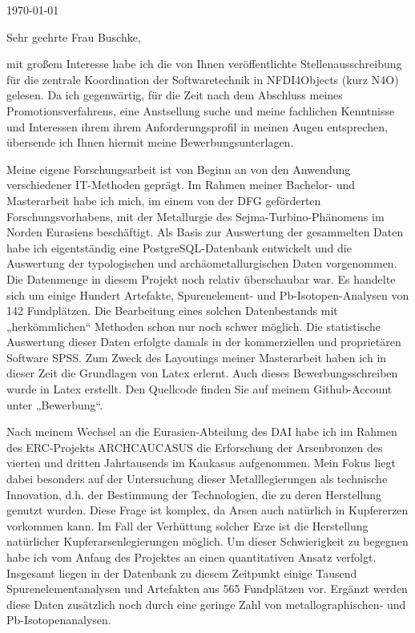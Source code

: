 \documentclass[10pt, a4paper]{article}
\begin{document}
\makeprofile %

\makecontact %

\today %

\makeemployerinfo %

Sehr geehrte Frau Buschke,

mit großem Interesse habe ich die von Ihnen veröffentlichte Stellenausschreibung für die zentrale Koordination der Softwaretechnik in NFDI4Objects (kurz N4O) gelesen. Da ich gegenwärtig, für die Zeit nach dem Abschluss meines Promotionsverfahrens, eine Anstsellung suche und meine fachlichen Kenntnisse und Interessen ihrem ihrem Anforderungsprofil in meinen Augen entsprechen, übersende ich Ihnen hiermit meine Bewerbungsunterlagen.

Meine eigene Forschungsarbeit ist von Beginn an von den Anwendung verschiedener IT-Methoden geprägt. Im Rahmen meiner Bachelor- und Masterarbeit habe ich mich, im einem von der DFG geförderten Forschungsvorhabens, mit der Metallurgie des Sejma-Turbino-Phänomens im Norden Eurasiens beschäftigt. Als Basis zur Auswertung der gesammelten Daten habe ich eigentständig eine PostgreSQL-Datenbank entwickelt und die Auswertung der typologischen und archäometallurgischen Daten vorgenommen. Die Datenmenge in diesem Projekt noch relativ überschaubar war. Es handelte sich um einige Hundert Artefakte, Spurenelement- und Pb-Isotopen-Analysen von 142 Fundplätzen. Die Bearbeitung eines solchen Datenbestands mit „herkömmlichen“ Methoden schon nur noch schwer möglich. Die statistische Auswertung dieser Daten erfolgte damals in der kommerziellen und proprietären Software SPSS. Zum Zweck des Layoutings meiner Masterarbeit haben ich in dieser Zeit die Grundlagen von Latex erlernt. Auch dieses Bewerbungsschreiben wurde in Latex erstellt. Den Quellcode finden Sie auf meinem Github-Account unter „Bewerbung“.

Nach meinem Wechsel an die Eurasien-Abteilung des DAI habe ich im Rahmen des ERC-Projekts ARCHCAUCASUS die Erforschung der Arsenbronzen des vierten und dritten Jahrtausends im Kaukasus aufgenommen. Mein Fokus liegt dabei besonders auf der Untersuchung dieser Metalllegierungen als technische Innovation, d.h. der Bestimmung der Technologien, die zu deren Herstellung genutzt wurden. Diese Frage ist komplex, da Arsen auch natürlich in Kupfererzen vorkommen kann. Im Fall der Verhüttung solcher Erze ist die Herstellung natürlicher Kupferarsenlegierungen möglich. Um dieser Schwierigkeit zu begegnen habe ich vom Anfang des Projektes an einen quantitativen Ansatz verfolgt. Insgesamt liegen in der Datenbank zu diesem Zeitpunkt einige Tausend Spurenelementanalysen und Artefakten aus 565 Fundplätzen vor. Ergänzt werden diese Daten zusätzlich noch durch eine geringe Zahl von metallographischen- und Pb-Isotopenanalysen. 
\end{document}
